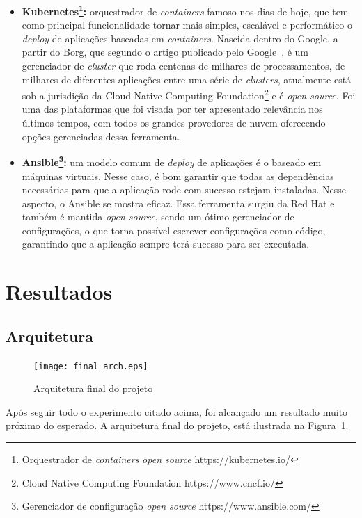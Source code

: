 \documentclass[11pt,twoside]{article}
\begin{document}
\begin{itemize}
  \item \textbf{Kubernetes\footnote{Orquestrador de \emph{containers} \emph{open source} https://kubernetes.io/}:} orquestrador de \emph{containers} famoso nos dias de hoje, que tem como principal funcionalidade tornar mais simples, escalável e performático o \emph{deploy}
  de aplicações baseadas em \emph{containers}. Nascida dentro do Google, a partir do Borg, que segundo o artigo publicado pelo Google~\cite{BORG}, é um gerenciador de \emph{cluster} que roda centenas de milhares de processamentos,
  de milhares de diferentes aplicações entre uma série de \emph{clusters},
  atualmente está sob a jurisdição da Cloud Native Computing Foundation\footnote{Cloud Native Computing Foundation https://www.cncf.io/} e é \emph{open source}. Foi uma
  das plataformas que foi visada por ter apresentado relevância nos últimos tempos, com todos os grandes provedores de nuvem oferecendo opções gerenciadas dessa 
  ferramenta.
  \item \textbf{Ansible\footnote{Gerenciador de configuração \emph{open source} https://www.ansible.com/}:} um modelo comum de \emph{deploy} de aplicações é o baseado em máquinas virtuais. Nesse caso, é bom garantir que todas as dependências necessárias para que a 
  aplicação rode com sucesso estejam instaladas. Nesse aspecto, o Ansible se mostra eficaz. Essa ferramenta surgiu da Red Hat e também é mantida \emph{open source}, sendo um
  ótimo gerenciador de configurações, o que torna possível escrever configurações como código, garantindo que a aplicação sempre terá sucesso para ser executada.
\end{itemize}

\section{Resultados}

\subsection{Arquitetura}

\begin{figure}[!h]
  \centering
  \texttt{[image: final\_arch.eps]}
  \caption{Arquitetura final do projeto}
  \label{fig:finalArch}
\end{figure}

Após seguir todo o experimento citado acima, foi alcançado um resultado muito próximo do esperado. A arquitetura final do projeto, está ilustrada na Figura~\ref{fig:finalArch}.
\end{document}
